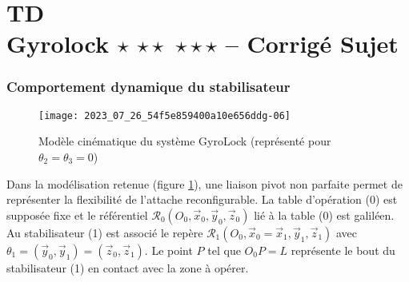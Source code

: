 \chapter*{TD  \\ 
Gyrolock  \ifnormal $\star$ \else \fi \ifdifficile $\star\star$ \else \fi \iftdifficile $\star\star\star$ \else \fi
-- \ifprof Corrigé \else Sujet \fi}

\iflivret {} \else
\ifprof  {} \else \fi
\fi

\setcounter{question}{0}

\ifprof  {}\else \fi

\subsection*{\label{sec:II.C} Comportement dynamique du stabilisateur}

\begin{figure}[!h]
\centering
\texttt{[image: 2023\_07\_26\_54f5e859400a10e656ddg-06]}
\caption{\label{fig:09}Modèle cinématique du système GyroLock (représenté pour $\theta_{2}=\theta_{3}=0$)}
\end{figure}

Dans la modélisation retenue (figure \ref{fig:09}), une liaison pivot non parfaite permet de représenter la flexibilité de l'attache reconfigurable. La table d'opération (0) est supposée fixe et le référentiel $\mathcal{R}_{0}\left(O_{0}, \vec{x}_{0}, \vec{y}_{0}, \vec{z}_{0}\right)$ lié à la table (0) est galiléen. Au stabilisateur (1) est associé le repère $\mathcal{R}_{1}\left(O_{0}, \vec{x}_{0}=\vec{x}_{1}, \vec{y}_{1}, \vec{z}_{1}\right)$ avec $\theta_{1}=\left(\vec{y}_{0}, \vec{y}_{1}\right)=\left(\vec{z}_{0}, \vec{z}_{1}\right)$. Le point $P$ tel que $O_{0} P=L$ représente le bout du stabilisateur (1) en contact avec la zone à opérer.

